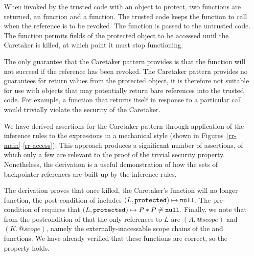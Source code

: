 \documentclass[a4paper,notitlepage]{report}
\begin{document}
When invoked by the trusted code with an object to protect, two functions are
returned, an  function and a  function. The trusted code keeps the
 function to call when the reference is to be revoked. The  function
is passed to the untrusted code.
The  function permits fields of the protected object to be accessed until
the Caretaker is killed, at which point it must stop functioning.

The only guarantee that the Caretaker pattern provides is that the 
function will not succeed if the reference has been revoked.
The Caretaker pattern provides no guarantees for return values from
the protected object, it is therefore not suitable for use with objects that may
potentially return bare references into the trusted code.
For example, a function that returns itself in response to a
particular call would trivially violate the security of the Caretaker.

We have derived assertions for the Caretaker pattern through application of the
inference rules to the expressions in a mechanical style (shown in
Figures~\ref{rr-main}-\ref{rr-access}). This approach produces
a significant number of assertions, of which only a few are relevant to the
proof of the trivial security property. Nonetheless, the derivation is a
useful demonstration of how the sets of backpointer references are built up by
the inference rules. 

The derivation proves that once killed, the Caretaker's  function will no
longer function, the post-condition of  includes $(L, \mathtt{protected})
\mapsto \mathtt{null}$. The pre-condition of  requires that $(L,
\mathtt{protected}) \mapsto P \mathbin{*} P \not\doteq \mathtt{null}$. Finally, we note that from
the postcondition of  that the only references to $L$ are
$(A, @scope)$ and $(K, @scope)$, namely the externally-inacessable scope chains
of the  and  functions. We have already verified that these
functions are correct, so the property holds.
\end{document}
